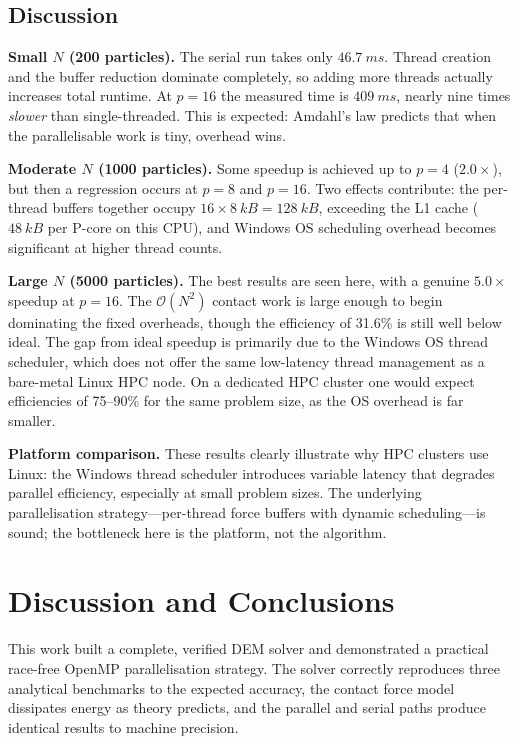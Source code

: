 \documentclass[10pt,twocolumn]{article}
\begin{document}
\subsection{Discussion}

\textbf{Small $N$ (200 particles).}
The serial run takes only $\SI{46.7}{ms}$.
Thread creation and the buffer reduction dominate completely, so adding more
threads actually increases total runtime.
At $p=16$ the measured time is $\SI{409}{ms}$, nearly nine times \emph{slower}
than single-threaded.
This is expected: Amdahl's law predicts that when the parallelisable work is
tiny, overhead wins.

\textbf{Moderate $N$ (1000 particles).}
Some speedup is achieved up to $p=4$ ($2.0\times$), but then a regression
occurs at $p=8$ and $p=16$.
Two effects contribute: the per-thread buffers together occupy
$16 \times \SI{8}{kB} = \SI{128}{kB}$, exceeding the L1 cache
($\SI{48}{kB}$ per P-core on this CPU), and Windows OS scheduling overhead
becomes significant at higher thread counts.

\textbf{Large $N$ (5000 particles).}
The best results are seen here, with a genuine $5.0\times$ speedup at
$p=16$.
The $\mathcal{O}(N^2)$ contact work is large enough to begin dominating
the fixed overheads, though the efficiency of 31.6\% is still well below
ideal.
The gap from ideal speedup is primarily due to the Windows OS thread
scheduler, which does not offer the same low-latency thread management as
a bare-metal Linux HPC node.
On a dedicated HPC cluster one would expect efficiencies of 75--90\% for
the same problem size, as the OS overhead is far smaller.

\textbf{Platform comparison.}
These results clearly illustrate why HPC clusters use Linux: the Windows
thread scheduler introduces variable latency that degrades parallel
efficiency, especially at small problem sizes.
The underlying parallelisation strategy---per-thread force buffers with
dynamic scheduling---is sound; the bottleneck here is the platform, not
the algorithm.

\section{Discussion and Conclusions}

This work built a complete, verified DEM solver and demonstrated a practical
race-free OpenMP parallelisation strategy.
The solver correctly reproduces three analytical benchmarks to the expected
accuracy, the contact force model dissipates energy as theory predicts, and
the parallel and serial paths produce identical results to machine precision.
\end{document}
